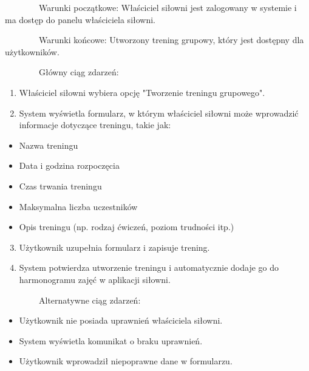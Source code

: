 \documentclass[
]{article}
\providecommand{\tightlist}{%
  \setlength{\itemsep}{0pt}\setlength{\parskip}{0pt}}
\begin{document}
{~~~~~~~~Warunki początkowe: Właściciel siłowni jest zalogowany w
systemie i ma dostęp do panelu właściciela siłowni.}

{~~~~~~~~Warunki końcowe: Utworzony trening grupowy, który jest dostępny
dla użytkowników.}

{~~~~~~~~Główny ciąg zdarzeń:}

\begin{enumerate}
\tightlist
\item
  {Właściciel siłowni wybiera opcję "Tworzenie treningu grupowego".}
\item
  {System wyświetla formularz, w którym właściciel siłowni może
  wprowadzić informacje dotyczące treningu, takie jak:}
\end{enumerate}

\begin{itemize}
\tightlist
\item
  {Nazwa treningu}
\item
  {Data i godzina rozpoczęcia}
\item
  {Czas trwania treningu}
\item
  {Maksymalna liczba uczestników}
\item
  {Opis treningu (np. rodzaj ćwiczeń, poziom trudności itp.)}
\end{itemize}

\begin{enumerate}
\setcounter{enumi}{2}
\tightlist
\item
  {Użytkownik uzupełnia formularz i zapisuje trening.}
\item
  {System potwierdza utworzenie treningu i automatycznie dodaje go do
  harmonogramu zajęć w aplikacji siłowni.}
\end{enumerate}

{~~~~~~~~Alternatywne ciąg zdarzeń:}

\begin{itemize}
\tightlist
\item
  {Użytkownik nie posiada uprawnień właściciela siłowni.}
\end{itemize}

\begin{itemize}
\tightlist
\item
  {System wyświetla komunikat o braku uprawnień.}
\end{itemize}

\begin{itemize}
\tightlist
\item
  {Użytkownik wprowadził niepoprawne dane w formularzu.}
\end{itemize}
\end{document}
